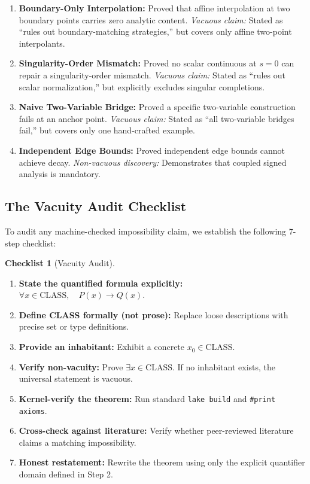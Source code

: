 \documentclass[11pt,a4paper]{article}
\theoremstyle{definition}
\newtheorem{checklist}{Checklist}
\theoremstyle{remark}
\begin{document}
\begin{enumerate}[label=\textbf{\arabic*.}]
  \item \textbf{Boundary-Only Interpolation:} Proved that affine interpolation at two boundary points carries zero analytic content. \emph{Vacuous claim:} Stated as ``rules out boundary-matching strategies,'' but covers only affine two-point interpolants.
  \item \textbf{Singularity-Order Mismatch:} Proved no scalar continuous at $s=0$ can repair a singularity-order mismatch. \emph{Vacuous claim:} Stated as ``rules out scalar normalization,'' but explicitly excludes singular completions.
  \item \textbf{Naive Two-Variable Bridge:} Proved a specific two-variable construction fails at an anchor point. \emph{Vacuous claim:} Stated as ``all two-variable bridges fail,'' but covers only one hand-crafted example.
  \item \textbf{Independent Edge Bounds:} Proved independent edge bounds cannot achieve decay. \emph{Non-vacuous discovery:} Demonstrates that coupled signed analysis is mandatory.
\end{enumerate}

\subsection{The Vacuity Audit Checklist}

To audit any machine-checked impossibility claim, we establish the following 7-step checklist:

\begin{checklist}[Vacuity Audit]
\label{checklist:vacuity}
\mbox{}
\begin{enumerate}[label=\arabic*)]
  \item \textbf{State the quantified formula explicitly:} $\forall x \in \text{CLASS}, \quad P(x) \to Q(x)$.
  \item \textbf{Define CLASS formally (not prose):} Replace loose descriptions with precise set or type definitions.
  \item \textbf{Provide an inhabitant:} Exhibit a concrete $x_0 \in \text{CLASS}$.
  \item \textbf{Verify non-vacuity:} Prove $\exists x \in \text{CLASS}$. If no inhabitant exists, the universal statement is vacuous.
  \item \textbf{Kernel-verify the theorem:} Run standard \texttt{lake build} and \texttt{\#print axioms}.
  \item \textbf{Cross-check against literature:} Verify whether peer-reviewed literature claims a matching impossibility.
  \item \textbf{Honest restatement:} Rewrite the theorem using only the explicit quantifier domain defined in Step 2.
\end{enumerate}
\end{checklist}
\end{document}
